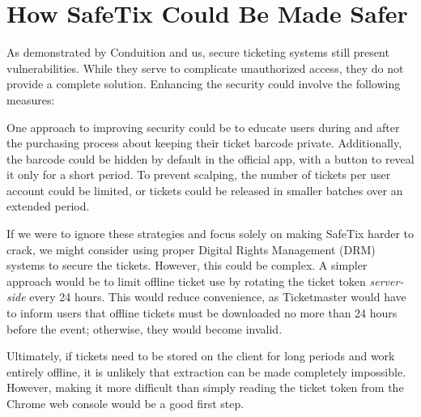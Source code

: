 \section{How SafeTix Could Be Made Safer}
As demonstrated by Conduition and us, secure ticketing systems still present vulnerabilities. 
While they serve to complicate unauthorized access, they do not provide a complete solution. 
Enhancing the security could involve the following measures:

One approach to improving security could be to educate users during and after the purchasing process 
about keeping their ticket barcode private. Additionally, the barcode could be hidden by default 
in the official app, with a button to reveal it only for a short period. To prevent scalping, 
the number of tickets per user account could be limited, or tickets could be released in smaller 
batches over an extended period.

If we were to ignore these strategies and focus solely on making SafeTix harder to crack, we might
consider using proper Digital Rights Management (DRM) systems to secure the tickets. However, 
this could be complex. A simpler approach would be to limit offline ticket use by rotating the 
ticket token \textit{server-side} every 24 hours. This would reduce convenience, as Ticketmaster 
would have to inform users that offline tickets must be downloaded no more than 24 hours before 
the event; otherwise, they would become invalid.

Ultimately, if tickets need to be stored on the client for long periods and work entirely offline, 
it is unlikely that extraction can be made completely impossible. However, making it more difficult 
than simply reading the ticket token from the Chrome web console would be a good first step.